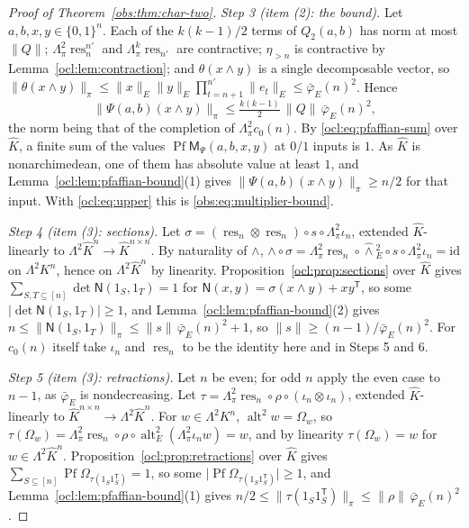 \documentclass[11pt]{amsart}
\theoremstyle{definition}
\theoremstyle{remark}
\numberwithin{equation}{section}
\newcommand{\id}{\mathrm{id}}
\newcommand{\abs}[1]{\lvert #1\rvert}
\newcommand{\norm}[1]{\lVert #1\rVert}
\theoremstyle{plain}
\theoremstyle{definition}
\theoremstyle{plain}
\newcommand{\alt}{\operatorname{alt}}
\begin{document}
\begin{proof}[Proof of Theorem~\ref{obs:thm:char-two}]
\emph{Step 3 (item (2): the bound).} Let $a,b,x,y\in\{0,1\}^n$. Each of the $k(k-1)/2$ terms of $Q_2(a,b)$ has norm at
most $\norm Q$; $\Lambda^2_\pi\operatorname{res}^{n'}_n$ and $\Lambda^k_\pi\operatorname{res}_{n'}$ are contractive;
$\eta_{>n}$ is contractive by Lemma~\ref{ocl:lem:contraction}; and $\theta(x\wedge y)$ is a single decomposable vector,
so $\norm{\theta(x\wedge y)}_\pi\le\norm x_E\norm y_E\prod_{t=n+1}^{n'}\norm{e_t}_E\le\bar\varphi_E(n)^2$. Hence
\begin{equation}\label{ocl:eq:upper}
\norm{\Psi(a,b)(x\wedge y)}_\pi\le\tfrac{k(k-1)}2\,\norm Q\,\bar\varphi_E(n)^2 ,
\end{equation}
the norm being that of the completion of $\Lambda^2_\pi c_0(n)$. By \eqref{ocl:eq:pfaffian-sum} over $\widehat K$, a
finite sum of the values $\operatorname{Pf}\mathsf M_\Psi(a,b,x,y)$ at $0/1$ inputs is $1$. As $\widehat K$ is
nonarchimedean, one of them has absolute value at least $1$, and
Lemma~\ref{ocl:lem:pfaffian-bound}(1) gives $\norm{\Psi(a,b)(x\wedge y)}_\pi\ge n/2$ for that input. With
\eqref{ocl:eq:upper} this is \eqref{obs:eq:multiplier-bound}.

\emph{Step 4 (item (3): sections).} Let $\sigma=(\operatorname{res}_n\otimes\operatorname{res}_n)\circ s\circ
\Lambda^2_\pi\iota_n$, extended $\widehat K$-linearly to $\Lambda^2\widehat K^n\to\widehat K^{n\times n}$. By naturality
of $\wedge$, $\wedge\circ\sigma=\Lambda^2_\pi\operatorname{res}_n\circ\widehat\wedge{}^2_E\circ s\circ
\Lambda^2_\pi\iota_n=\id$ on $\Lambda^2K^n$, hence on $\Lambda^2\widehat K^n$ by linearity.
Proposition~\ref{ocl:prop:sections} over $\widehat K$ gives $\sum_{S,T\subseteq[n]}\det\mathsf N(1_S,1_T)=1$ for
$\mathsf N(x,y)=\sigma(x\wedge y)+xy^{\mathsf T}$, so some $\abs{\det\mathsf N(1_S,1_T)}\ge1$, and
Lemma~\ref{ocl:lem:pfaffian-bound}(2) gives $n\le\norm{\mathsf N(1_S,1_T)}_\pi\le\norm s\,\bar\varphi_E(n)^2+1$, so
$\norm s\ge(n-1)/\bar\varphi_E(n)^2$. For $c_0(n)$ itself take $\iota_n$ and $\operatorname{res}_n$ to be the identity
here and in Steps 5 and 6.

\emph{Step 5 (item (3): retractions).} Let $n$ be even; for odd $n$ apply the even case to $n-1$, as $\bar\varphi_E$ is
nondecreasing. Let $\tau=\Lambda^2_\pi\operatorname{res}_n\circ\rho\circ(\iota_n\otimes\iota_n)$, extended
$\widehat K$-linearly to $\widehat K^{n\times n}\to\Lambda^2\widehat K^n$. For $w\in\Lambda^2K^n$,
$\alt^2w=\Omega_w$, so $\tau(\Omega_w)=\Lambda^2_\pi\operatorname{res}_n\circ\rho\circ
\alt^2_E(\Lambda^2_\pi\iota_nw)=w$, and by linearity $\tau(\Omega_w)=w$ for $w\in\Lambda^2\widehat K^n$.
Proposition~\ref{ocl:prop:retractions} over $\widehat K$ gives
$\sum_{S\subseteq[n]}\operatorname{Pf}\Omega_{\tau(1_S1_S^{\mathsf T})}=1$, so some
$\abs{\operatorname{Pf}\Omega_{\tau(1_S1_S^{\mathsf T})}}\ge1$, and Lemma~\ref{ocl:lem:pfaffian-bound}(1) gives
$n/2\le\norm{\tau(1_S1_S^{\mathsf T})}_\pi\le\norm\rho\,\bar\varphi_E(n)^2$.


\end{proof}
\end{document}
